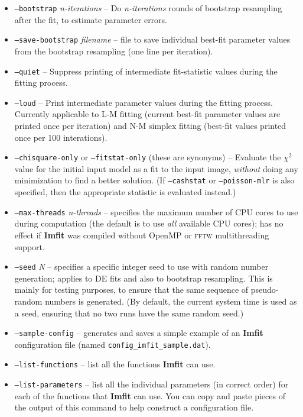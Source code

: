 \documentclass[10pt,a4paper,article]{memoir}
\newcommand{\imfit}{\textbf{Imfit}}
\newcommand{\chisquare}{\ensuremath{\chi^{2}}}
\begin{document}
\begin{itemize}
\bigskip

\item \texttt{--bootstrap} \textit{n-iterations} -- Do \textit{n-iterations} rounds
of bootstrap resampling after the fit, to estimate parameter errors.

\item \texttt{--save-bootstrap} \textit{filename} -- file to save
individual best-fit parameter values from the bootstrap resampling (one
line per iteration).

\bigskip

\item \texttt{--quiet} -- Suppress printing of intermediate fit-statistic values
during the fitting process.

\item \texttt{--loud} -- Print intermediate parameter values during the fitting
process. Currently applicable to L-M fitting (current best-fit parameter values are
printed once per iteration) and N-M simplex fitting (best-fit values printed once per 100 interations).

\bigskip

\item \texttt{--chisquare-only} or \texttt{--fitstat-only} (these are
synonyms) -- Evaluate the \chisquare{} value for the initial input
model as a fit to the input image, \textit{without} doing any
minimization to find a better solution. (If \texttt{--cashstat} or
\texttt{--poisson-mlr} is also specified, then the appropriate 
statistic is evaluated instead.)

\bigskip

\item \texttt{--max-threads} \textit{n-threads} -- specifies the maximum number of CPU cores to use
during computation (the default is to use \textit{all} available CPU cores); has no
effect if \imfit{} was compiled without OpenMP or \textsc{fftw} multithreading support.

\item \texttt{--seed} \textit{N} -- specifies a specific integer seed to use with
random number generation; applies to DE fits and also to bootstrap resampling. This is
mainly for testing purposes, to ensure that the same sequence of pseudo-random
numbers is generated. (By default, the current system time is used as a seed,
ensuring that no two runs have the same random seed.)

\bigskip

\item \texttt{--sample-config} -- generates and saves a simple example
of an \imfit{} configuration file (named
\texttt{config\_imfit\_sample.dat}).

\item \texttt{--list-functions} -- list all the functions \imfit{} can use.

\item \texttt{--list-parameters} -- list all the individual parameters (in correct order)
for each of the functions that \imfit{} can use. You can copy and paste pieces of the output
of this command to help construct a configuration file.
\end{itemize}
\end{document}
